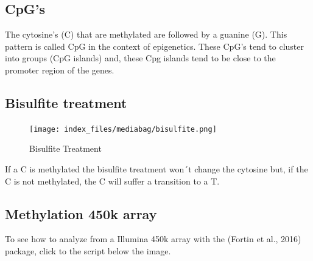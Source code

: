 \documentclass[
]{agujournal2019}
\begin{document}
\subsection{CpG's}\label{cpgs}

The cytosine's (C) that are methylated are followed by a guanine (G).
This pattern is called CpG in the context of epigenetics. These CpG's
tend to cluster into groups (CpG islands) and, these Cpg islands tend to
be close to the promoter region of the genes.

\subsection{Bisulfite treatment}\label{bisulfite-treatment}

\begin{figure}[H]

{\centering \texttt{[image: index\_files/mediabag/bisulfite.png]}

}

\caption{Bisulfite Treatment}

\end{figure}%

If a C is methylated the bisulfite treatment won´t change the cytosine
but, if the C is not methylated, the C will suffer a transition to a T.

\subsection{Methylation 450k array}\label{methylation-450k-array}

To see how to analyze from a Illumina 450k array with the (Fortin et
al., 2016) package, click to the script below the image.

\begin{figure}[H]


\caption{\label{fig-meth}}

\end{figure}%
\end{document}
